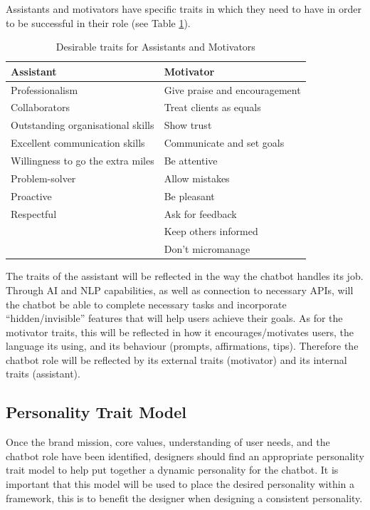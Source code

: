     Assistants and motivators have specific traits \citep{burge2016,lipcamon_2013} in which they need to have in order to be successful in their role (see Table \ref{table:2}).
    
\vspace{2,5mm}

    \begin{table}[h]
    \begin{tabular}{ |p{}||p{}|  }
    \hline
    Assistant & Motivator \\
    \hline
        Professionalism & Give praise and encouragement \\
        Collaborators & Treat clients as equals \\
        Outstanding organisational skills & Show trust \\
        Excellent communication skills & Communicate and set goals \\
        Willingness to go the extra miles & Be attentive \\
        Problem-solver & Allow mistakes \\
        Proactive & Be pleasant \\
        Respectful & Ask for feedback \\
        & Keep others informed \\
        & Don’t micromanage \\
    \hline
    \end{tabular}
    \caption{Desirable traits for Assistants and Motivators}
    \label{table:2}
    \end{table}
 
    The traits of the assistant will be reflected in the way the chatbot handles its job. Through AI and NLP capabilities, as well as connection to necessary APIs, will the chatbot be able to complete necessary tasks and incorporate “hidden/invisible” features that will help users achieve their goals. As for the motivator traits, this will be reflected in how it encourages/motivates users, the language its using, and its behaviour (prompts, affirmations, tips). Therefore the chatbot role will be reflected by its external traits (motivator) and its internal traits (assistant).
    
\vspace{5mm}

    \subsection{Personality Trait Model}
    Once the brand mission, core values, understanding of user needs, and the chatbot role have been identified, designers should find an appropriate personality trait model to help put together a dynamic personality for the chatbot. It is important that this model will be used to place the desired personality within a framework, this is to benefit the designer when designing a consistent personality. 
    
